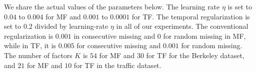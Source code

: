 %


We share the actual values of the parameters below.
The learning rate $\eta$ is set to $0.04$ to $0.004$ for MF and $0.001$ to $0.0001$ for TF.
The temporal regularization is set to $0.2$ divided by learning-rate $\eta$ in all of our experiments.
The conventional regularization is $0.001$ in consecutive missing and $0$ for random missing in MF, while in TF, it is $0.005$ for consecutive missing and $0.001$ for random missing.
The number of factors $K$ is $54$ for MF and $30$ for TF for the Berkeley dataset, and $21$ for MF and $10$ for TF in the traffic dataset. 


